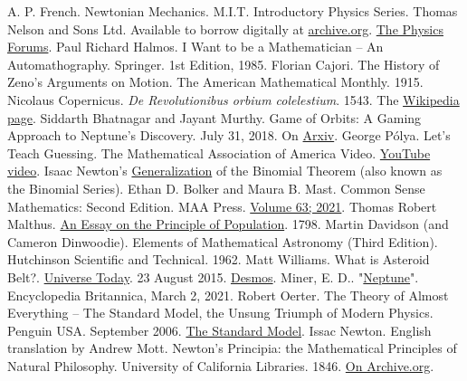 \documentclass[12pt,a4paper]{book}
\begin{document}
\begin{thebibliography}{00}
     A. P. French. Newtonian Mechanics. M.I.T. Introductory Physics Series. Thomas Nelson and Sons Ltd. Available to borrow digitally at \href{http://archive.org}{archive.org}.
     \href{https://physicsforums.com}{The Physics Forums}.
     Paul Richard Halmos. I Want to be a Mathematician -- An Automathography. Springer. 1st Edition, 1985.
     Florian Cajori. The History of Zeno's Arguments on Motion. The American Mathematical Monthly. 1915.
     Nicolaus Copernicus. \textit{De Revolutionibus orbium colelestium}. 1543. The \href{https://en.wikipedia.org/wiki/Nicolaus_Copernicus#The_book}{Wikipedia page}.
     Siddarth Bhatnagar and Jayant Murthy. Game of Orbits: A Gaming Approach to Neptune's Discovery. July 31, 2018. On \href{https://arxiv.org/pdf/1807.11280.pdf}{Arxiv}.
     George P{\'o}lya. Let's Teach Guessing. The Mathematical Association of America Video. \href{https://www.youtube.com/watch?v=h0gbw-Ur_do}{YouTube video}.
     Isaac Newton's \href{https://en.wikipedia.org/wiki/Binomial_theorem#Newton's_generalized_binomial_theorem}{Generalization} of the Binomial Theorem (also known as the Binomial Series). 
     Ethan D. Bolker and Maura B. Mast. Common Sense Mathematics: Second Edition. MAA Press. \href{https://bookstore.ams.org/text-63}{Volume 63; 2021}.
     Thomas Robert Malthus. \href{https://en.wikipedia.org/wiki/An_Essay_on_the_Principle_of_Population}{An Essay on the Principle of Population}. 1798.
     Martin Davidson (and Cameron Dinwoodie). Elements of Mathematical Astronomy (Third Edition). Hutchinson Scientific and Technical. 1962.
     Matt Williams. What is Asteroid Belt?. \href{https://www.universetoday.com/32856/asteroid-belt/}{Universe Today}. 23 August 2015.
     \href{https://www.desmos.com}{Desmos}. 
     Miner, E. D.. "\href{https://www.britannica.com/place/Neptune-planet}{Neptune}". Encyclopedia Britannica, March 2, 2021. 
     Robert Oerter. The Theory of Almost Everything -- The Standard Model, the Unsung Triumph of Modern Physics. Penguin USA. September 2006.
     \href{https://en.wikipedia.org/wiki/Standard_Model}{The Standard Model}.
     Issac Newton. English translation by Andrew Mott. Newton's Principia: the Mathematical Principles of Natural Philosophy. University of California Libraries. 1846. \href{https://archive.org/details/newtonspmathema00newtrich/page/n27/mode/2up}{On Archive.org}.

\end{thebibliography}
\end{document}
